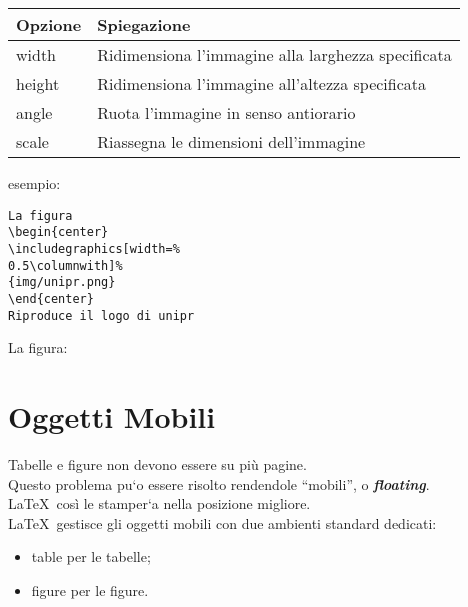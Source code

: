 \documentclass{article}
\begin{document}
                    \begin{center}
                        \begin{tabular}{II}
                            \toprule
                            Opzione & Spiegazione \\
                            \midrule
                            width & Ridimensiona l'immagine alla larghezza specificata \\
                            height & Ridimensiona l'immagine all'altezza specificata \\
                            angle & Ruota l'immagine in senso antiorario \\
                            scale & Riassegna le dimensioni dell'immagine \\
                            \bottomrule
                        \end{tabular}
                    \end{center}

                    esempio:   
\begin{multicols}{2}
\begin{lstlisting}[frame=single]
La figura
\begin{center}
\includegraphics[width=%
0.5\columnwith]%
{img/unipr.png}
\end{center}
Riproduce il logo di unipr
\end{lstlisting}
%
\columnbreak{}
%
La figura:
\end{multicols}

                \section{Oggetti Mobili}
                    Tabelle e figure non devono essere su più pagine. \\
                    Questo problema pu`o essere risolto rendendole “mobili”, o \emph{\textbf{floating}}. \\
                    \LaTeX\ così le stamper`a nella posizione migliore. \\
                    \LaTeX\ gestisce gli oggetti mobili con due ambienti standard dedicati: 
                    \begin{itemize}
                        \item table per le tabelle;
                        \item figure per le figure.
                    \end{itemize}
\end{document}
